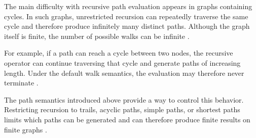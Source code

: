 The main difficulty with recursive path evaluation appears in graphs containing cycles. In such graphs, unrestricted recursion can repeatedly traverse the same cycle and therefore produce infinitely many distinct paths. Although the graph itself is finite, the number of possible walks can be infinite \cite{angles2024path}.

For example, if a path can reach a cycle between two nodes, the recursive operator can continue traversing that cycle and generate paths of increasing length. Under the default walk semantics, the evaluation may therefore never terminate \cite{angles2024path}.

The path semantics introduced above provide a way to control this behavior. Restricting recursion to trails, acyclic paths, simple paths, or shortest paths limits which paths can be generated and can therefore produce finite results on finite graphs \cite{angles2024path}.